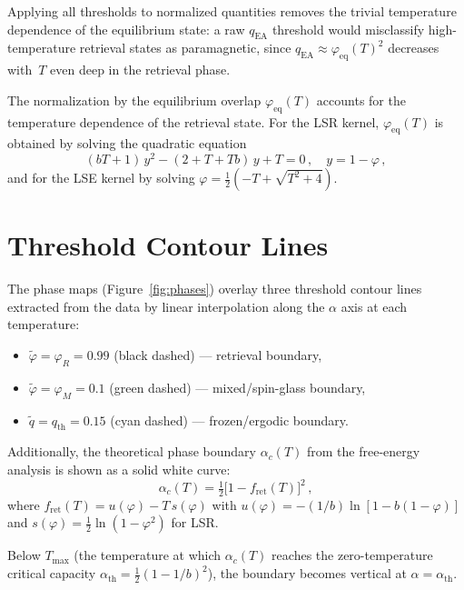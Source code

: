 \documentclass[11pt]{article}
\begin{document}
\noindent
Applying all thresholds to normalized quantities removes the trivial temperature dependence of the equilibrium state: a raw $q_{\mathrm{EA}}$ threshold would misclassify high-temperature retrieval states as paramagnetic, since $q_{\mathrm{EA}} \approx \varphi_{\mathrm{eq}}(T)^2$ decreases with~$T$ even deep in the retrieval phase.

The normalization by the equilibrium overlap $\varphi_{\mathrm{eq}}(T)$ accounts for the temperature dependence of the retrieval state. For the LSR kernel, $\varphi_{\mathrm{eq}}(T)$ is obtained by solving the quadratic equation
\begin{equation}
    (bT + 1)\, y^2 - (2 + T + Tb)\, y + T = 0\,,\quad y = 1 - \varphi\,,
\end{equation}
and for the LSE kernel by solving $\varphi = \tfrac{1}{2}(-T + \sqrt{T^2 + 4})$.

\section{Threshold Contour Lines}
\label{sec:contours}

The phase maps (Figure~\ref{fig:phases}) overlay three threshold contour lines extracted from the data by linear interpolation along the $\alpha$ axis at each temperature:
\begin{itemize}
    \item $\tilde\varphi = \varphi_R = 0.99$ (black dashed) --- retrieval boundary,
    \item $\tilde\varphi = \varphi_M = 0.1$ (green dashed) --- mixed/spin-glass boundary,
    \item $\tilde q = q_{\mathrm{th}} = 0.15$ (cyan dashed) --- frozen/ergodic boundary.
\end{itemize}

\noindent
Additionally, the theoretical phase boundary $\alpha_c(T)$ from the free-energy analysis is shown as a solid white curve:
\begin{equation}
    \alpha_c(T) = \tfrac{1}{2}\bigl[1 - f_{\mathrm{ret}}(T)\bigr]^2\,,
\end{equation}
where $f_{\mathrm{ret}}(T) = u(\varphi) - T\, s(\varphi)$ with $u(\varphi) = -(1/b)\ln[1 - b(1-\varphi)]$ and $s(\varphi) = \tfrac{1}{2}\ln(1-\varphi^2)$ for LSR.

Below $T_{\max}$ (the temperature at which $\alpha_c(T)$ reaches the zero-temperature critical capacity $\alpha_{\mathrm{th}} = \tfrac{1}{2}(1-1/b)^2$), the boundary becomes vertical at $\alpha = \alpha_{\mathrm{th}}$.
\end{document}
